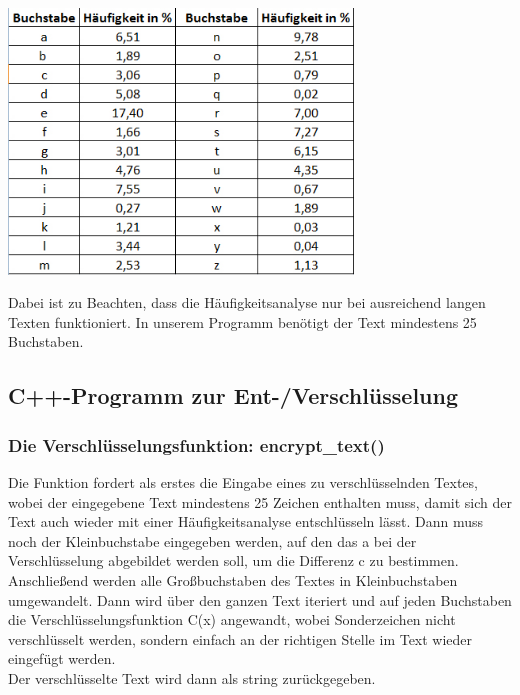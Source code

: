 \documentclass[ngerman,12pt]{article}
\begin{document}
\begin{center}
\includegraphics[width=260pt,height=200pt]{buchstaben-haeufigkeit-deutsches-alphabet.jpg}
\end{center}

Dabei ist zu Beachten, dass die Häufigkeitsanalyse nur bei ausreichend langen Texten funktioniert. In unserem Programm benötigt der Text mindestens 25 Buchstaben.

\newpage

\subsection*{C++-Programm zur Ent-/Verschlüsselung}

\subsubsection*{Die Verschlüsselungsfunktion: encrypt\_text()}

Die Funktion fordert als erstes die Eingabe eines zu verschlüsselnden Textes, wobei der eingegebene Text mindestens 25 Zeichen enthalten muss, damit sich der Text auch wieder mit einer Häufigkeitsanalyse entschlüsseln lässt. Dann muss noch der Kleinbuchstabe eingegeben werden, auf den das a bei der Verschlüsselung abgebildet werden soll, um die Differenz c zu bestimmen. \\
Anschließend werden alle Großbuchstaben des Textes in Kleinbuchstaben umgewandelt. Dann wird über den ganzen Text iteriert und auf jeden Buchstaben die Verschlüsselungsfunktion C(x) angewandt, wobei Sonderzeichen nicht verschlüsselt werden, sondern einfach an der richtigen Stelle im Text wieder eingefügt werden. \\
Der verschlüsselte Text wird dann als string zurückgegeben.
\end{document}
